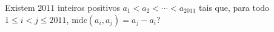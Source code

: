 Existem $2011$ inteiros positivos $a_1 < a_2 < \cdots < a_{2011}$ tais que, para todo $1 \le i < j \le 2011$, $\mathrm{mdc}(a_i, a_j) = a_j - a_i$?